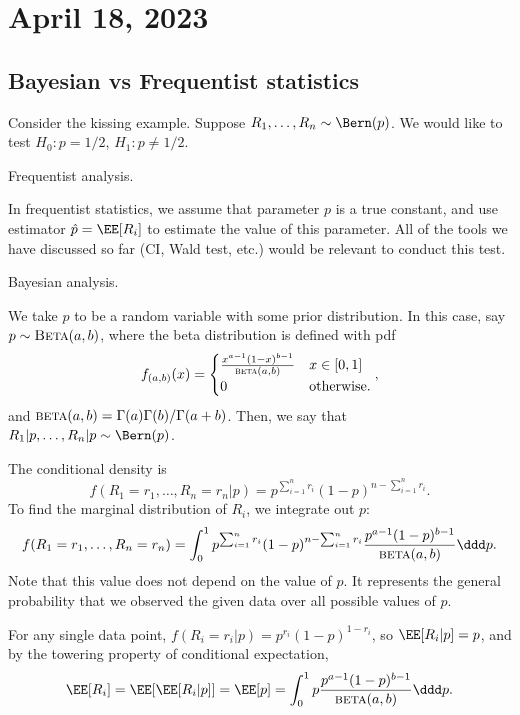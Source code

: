 \section{April 18, 2023}

\subsection{Bayesian vs Frequentist statistics}

Consider the kissing example. Suppose $R_1, \hdots, R_n\sim \Bern(p)$. We would like to test $H_0: p=1/2$, $H_1: p\neq 1/2$.

\begin{example}
\exlabel

Frequentist analysis.
\end{example}

In frequentist statistics, we assume that parameter $p$ is a true constant, and use estimator $\hat{p} = \EE[R_i]$ to estimate the value of this parameter. All of the tools we have discussed so far (CI, Wald test, etc.) would be relevant to conduct this test. 

\begin{example}
\exlabel

Bayesian analysis.
\end{example}

We take $p$ to be a random variable with some \ac{prior distribution}. In this case, say $p\sim \textsc{Beta}(a,b)$, where the beta distribution is defined with pdf 
\[f_{(a,b)}(x) = \begin{cases}
\frac{x^{a-1}(1-x)^{b-1}}{\textsc{beta}(a,b)} & x\in [0,1] \\
0 & \text{otherwise}.
\end{cases},\]
and $\textsc{beta}(a,b) = \Gamma(a)\Gamma(b)/\Gamma(a+b)$. Then, we say that $R_1|p, \hdots, R_n|p \sim \Bern(p)$. 

The conditional density is 
\[f(R_1=r_1, \hdots, R_n=r_n | p) = p^{\sum_{i=1}^n r_i}(1-p)^{n-\sum_{i=1}^nr_i}.\]
To find the marginal distribution of $R_i$, we integrate out $p$:
\[f(R_1=r_1, \hdots, R_n=r_n) = \int_{0}^1 p^{\sum_{i=1}^n r_i}(1-p)^{n-\sum_{i=1}^nr_i} \frac{p^{a-1}(1-p)^{b-1}}{\textsc{beta}(a,b)} \ddd p.\]
Note that this value does not depend on the value of $p$. It represents the general probability that we observed the given data over all possible values of $p$. 

For any single data point, $f(R_i=r_i|p) = p^{r_i}(1-p)^{1-r_i}$, so $\EE[R_i|p] = p$, and by the towering property of conditional expectation, 
\[\EE[R_i] = \EE[\EE[R_i|p]] = \EE[p] = \int_{0}^1p\frac{p^{a-1}(1-p)^{b-1}}{\textsc{beta}(a,b)} \ddd p.\]

